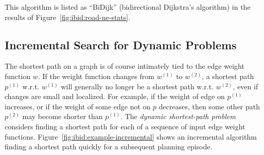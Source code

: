 This algorithm is listed as ``BiDijk''
(bidirectional Dijkstra's algorithm)
in the results of Figure~\ref{fig:ibid:road-ne-stats}.


\subsection{Incremental Search for Dynamic Problems}
\label{sec:ibid:incremental}

The shortest path on a graph is of course intimately tied to
the edge weight function $w$.
If the weight function changes from $w^{(1)}$ to $w^{(2)}$,
a shortest path $p^{(1)}$ w.r.t. $w^{(1)}$
will generally no longer be a shortest path w.r.t. $w^{(2)}$,
even if changes are small and localized.
For example,
if the weight of edge on $p^{(1)}$ increases,
or if the weight of some edge not on $p$ decreases,
then some other path $p^{(2)}$ may become shorter than $p^{(1)}$.
The \emph{dynamic shortest-path problem}
considers finding a shortest path
for each of a sequence of input edge weight functions.
Figure~\ref{fig:ibid:example-incremental}
shows an incremental algorithm finding a shortest path quickly
for a subsequent planning episode.

